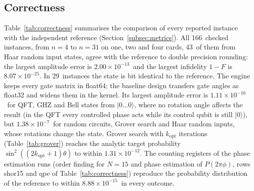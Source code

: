 \documentclass[pdflatex,sn-mathphys-num]{sn-jnl}
\newcommand{\ket}[1]{\lvert #1\rangle}
\newcommand{\NumBaselineExactErrMax}{$1.11\times 10^{-16}$}
\newcommand{\NumBaselineRotErrMax}{$1.38\times 10^{-7}$}
\newcommand{\NumCorrectnessExact}{29}
\newcommand{\NumCorrectnessHaar}{43}
\newcommand{\NumCorrectnessInstances}{166}
\newcommand{\NumCorrectnessNmax}{31}
\newcommand{\NumCorrectnessNmin}{4}
\newcommand{\NumGroverWorstPdiff}{$1.31\times 10^{-12}$}
\newcommand{\NumQpeWorstDistDiff}{$8.88\times 10^{-15}$}
\newcommand{\NumWorstMaxAbsErr}{$2.00\times 10^{-13}$}
\newcommand{\NumWorstOneMinusF}{$8.07\times 10^{-25}$}
\theoremstyle{thmstyleone}
\theoremstyle{thmstylethree}
\begin{document}
\subsection{Correctness}\label{subsec:res-correctness}

Table~\ref{tab:correctness} summarises the comparison of every reported instance with the independent reference
(Section~\ref{subsec:metrics}). All \NumCorrectnessInstances~checked instances, from $n=\NumCorrectnessNmin$ to
$n=\NumCorrectnessNmax$ on one, two and four cards, \NumCorrectnessHaar~of them from Haar random input states, agree with the
reference to double precision rounding: the largest amplitude error is \NumWorstMaxAbsErr\ and the largest infidelity
$1-F$ is \NumWorstOneMinusF. In \NumCorrectnessExact~instances the state is bit identical to the reference. The engine keeps every gate matrix in
float64; the baseline design transfers gate angles as float32 and widens them in the kernel. Its largest amplitude
error is \NumBaselineExactErrMax\ for QFT, GHZ and Bell states from $\ket{0\dots0}$, where no rotation angle affects the
result (in the QFT every controlled phase acts while its control qubit is still $\ket{0}$), but \NumBaselineRotErrMax\ for
random circuits, Grover search and Haar random inputs, whose rotations change the state. Grover search with $k_{\mathrm{opt}}$ iterations
(Table~\ref{tab:grover}) reaches the analytic target probability $\sin^2((2k_{\mathrm{opt}}+1)\theta)$ to within
\NumGroverWorstPdiff. The counting registers of the phase estimation runs (order finding for $N=15$ and phase estimation
of $P(2\pi\phi)$, rows shor15 and qpe of Table~\ref{tab:correctness}) reproduce the probability distribution of the
reference to within \NumQpeWorstDistDiff~in every outcome.
\end{document}
